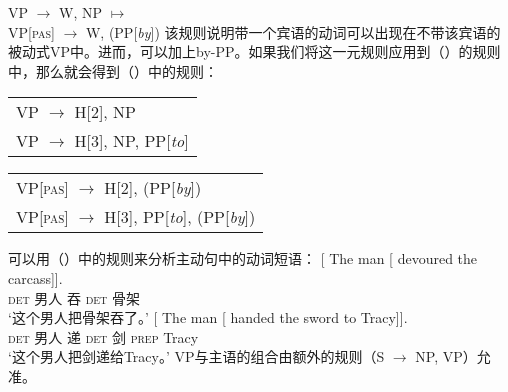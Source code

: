 \ea
VP  $\to$ W, NP $\mapsto$\\
VP[\textsc{pas}]  $\to$ W, (PP[\emph{by}])
\z
该规则说明带一个宾语的动词可以出现在不带该宾语的被动式VP中。进而，可以加上by-PP。如果我们将这一元规则应用到（）的规则中，那么就会得到（）中的规则：
\ea
\begin{tabular}[t]{@{}l@{}}
VP $\to$ H[2], NP\\
VP $\to$ H[3], NP, PP[\emph{to}]\\
\end{tabular}
\z
\ea
\begin{tabular}[t]{@{}l@{}}
VP[\textsc{pas}] $\to$ H[2], (PP[\emph{by}])\\
VP[\textsc{pas}] $\to$ H[3], PP[\emph{to}], (PP[\emph{by}])\\
\end{tabular}
\z
可以用（）中的规则来分析主动句中的动词短语：
\eal
\ex
\gll {} [ The man [ devoured the carcass]].\\
{} {} \textsc{det} 男人 {} 吞 \textsc{det} 骨架\\
\glt `这个男人把骨架吞了。'
\ex
\gll {} [ The man [ handed the sword to Tracy]].\\
{} {} \textsc{det} 男人 {} 递 \textsc{det} 剑 \textsc{prep} Tracy\\
\glt `这个男人把剑递给Tracy。'
\zl
VP与主语的组合由额外的规则（S $\to$ NP, VP）允准。

